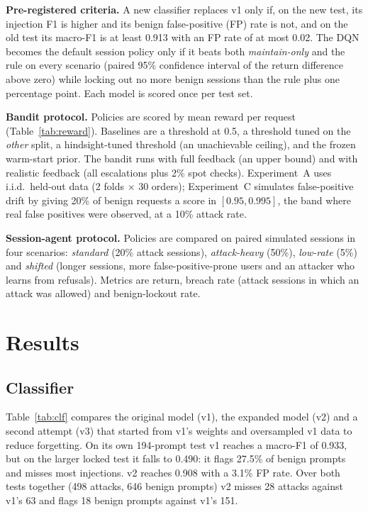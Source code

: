 \documentclass[conference]{IEEEtran}
\begin{document}
\textbf{Pre-registered criteria.} A new classifier replaces v1 only if, on
the new test, its injection F1 is higher and its benign false-positive
(FP) rate is not, and on the old test its macro-F1 is at least 0.913 with
an FP rate of at most 0.02. The DQN becomes the default session policy only
if it beats both \emph{maintain-only} and the rule on every scenario (paired
95\% confidence interval of the return difference above zero) while locking
out no more benign sessions than the rule plus one percentage point. Each
model is scored once per test set.

\textbf{Bandit protocol.} Policies are scored by mean reward per request
(Table~\ref{tab:reward}). Baselines are a threshold at 0.5, a threshold
tuned on the \emph{other} split, a hindsight-tuned threshold (an
unachievable ceiling), and the frozen warm-start prior. The bandit runs with
full feedback (an upper bound) and with realistic feedback (all escalations
plus 2\% spot checks). Experiment~A uses i.i.d.\ held-out data (2 folds
$\times$ 30 orders); Experiment~C simulates false-positive drift by giving
20\% of benign requests a score in $[0.95,0.995]$, the band where real false
positives were observed, at a 10\% attack rate.

\textbf{Session-agent protocol.} Policies are compared on paired simulated
sessions in four scenarios: \emph{standard} (20\% attack sessions),
\emph{attack-heavy} (50\%), \emph{low-rate} (5\%) and \emph{shifted}
(longer sessions, more false-positive-prone users and an attacker who
learns from refusals). Metrics are return, breach rate (attack sessions in
which an attack was allowed) and benign-lockout rate.

\section{Results}

\subsection{Classifier}

Table~\ref{tab:clf} compares the original model (v1), the expanded model
(v2) and a second attempt (v3) that started from v1's weights and
oversampled v1 data to reduce forgetting. On its own 194-prompt test v1
reaches a macro-F1 of 0.933, but on the larger locked test it falls to
0.490: it flags 27.5\% of benign prompts and misses most injections. v2
reaches 0.908 with a 3.1\% FP rate. Over both tests together (498 attacks,
646 benign prompts) v2 misses 28 attacks against v1's 63 and flags 18
benign prompts against v1's 151.
\end{document}
